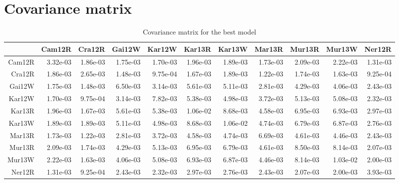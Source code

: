 \documentclass[a4paper,11pt]{article}\usepackage[]{graphicx}\usepackage[]{xcolor}
\begin{document}
\clearpage
\section{Covariance matrix}
\begin{table}[ht]\begin{flushleft}\caption{Covariance matrix for the best model}\resizebox{\textwidth}{!} {%
\begin{tabular}{rrrrrrrrrrr}
  \hline
 & Cam12R & Cra12R & Gai12W & Kar12W & Kar13R & Kar13W & Mar13R & Mur13R & Mur13W & Ner12R \\ 
  \hline
Cam12R & 3.32e-03 & 1.86e-03 & 1.75e-03 & 1.70e-03 & 1.96e-03 & 1.89e-03 & 1.73e-03 & 2.09e-03 & 2.22e-03 & 1.31e-03 \\ 
  Cra12R & 1.86e-03 & 2.65e-03 & 1.48e-03 & 9.75e-04 & 1.67e-03 & 1.89e-03 & 1.22e-03 & 1.74e-03 & 1.63e-03 & 9.25e-04 \\ 
  Gai12W & 1.75e-03 & 1.48e-03 & 6.50e-03 & 3.14e-03 & 5.61e-03 & 5.11e-03 & 2.81e-03 & 4.29e-03 & 4.06e-03 & 2.43e-03 \\ 
  Kar12W & 1.70e-03 & 9.75e-04 & 3.14e-03 & 7.82e-03 & 5.38e-03 & 4.98e-03 & 3.72e-03 & 5.13e-03 & 5.08e-03 & 2.32e-03 \\ 
  Kar13R & 1.96e-03 & 1.67e-03 & 5.61e-03 & 5.38e-03 & 1.06e-02 & 8.68e-03 & 4.58e-03 & 6.95e-03 & 6.93e-03 & 2.97e-03 \\ 
  Kar13W & 1.89e-03 & 1.89e-03 & 5.11e-03 & 4.98e-03 & 8.68e-03 & 1.06e-02 & 4.74e-03 & 6.79e-03 & 6.87e-03 & 2.76e-03 \\ 
  Mar13R & 1.73e-03 & 1.22e-03 & 2.81e-03 & 3.72e-03 & 4.58e-03 & 4.74e-03 & 6.69e-03 & 4.61e-03 & 4.46e-03 & 2.43e-03 \\ 
  Mur13R & 2.09e-03 & 1.74e-03 & 4.29e-03 & 5.13e-03 & 6.95e-03 & 6.79e-03 & 4.61e-03 & 8.50e-03 & 8.14e-03 & 2.07e-03 \\ 
  Mur13W & 2.22e-03 & 1.63e-03 & 4.06e-03 & 5.08e-03 & 6.93e-03 & 6.87e-03 & 4.46e-03 & 8.14e-03 & 1.03e-02 & 2.00e-03 \\ 
  Ner12R & 1.31e-03 & 9.25e-04 & 2.43e-03 & 2.32e-03 & 2.97e-03 & 2.76e-03 & 2.43e-03 & 2.07e-03 & 2.00e-03 & 3.93e-03 \\ 
   \hline
\end{tabular}
}\end{flushleft}\end{table}
\end{document}
